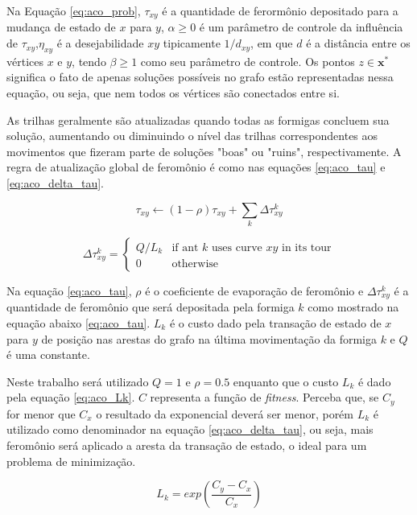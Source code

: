 Na Equação \ref{eq:aco_prob}, $\tau _{xy}$ é a quantidade de ferormônio depositado para a mudança de estado de $x$ para $y$, $\alpha \geq 0$  é um parâmetro de controle da influência de $\tau _{xy}$,$\eta _{xy}$ é a desejabilidade $xy$ tipicamente $1/d_{{xy}}$, em que $d$ é a distância entre os vértices $\textit{x}$ e $\textit{y}$, tendo $\beta  \geq 1$ como seu parâmetro de controle. Os pontos $z\in \mathbf{x^*}$ significa o fato de apenas soluções possíveis no grafo estão representadas nessa equação, ou seja, que nem todos os vértices são conectados entre si.

As trilhas geralmente são atualizadas quando todas as formigas concluem sua solução, aumentando ou diminuindo o nível das trilhas correspondentes aos movimentos que fizeram parte de soluções "boas" ou "ruins", respectivamente. A regra de atualização global de feromônio é como nas equações \ref{eq:aco_tau} e \ref{eq:aco_delta_tau}.

\begin{equation}
\label{eq:aco_tau}
    \tau_{xy} \leftarrow
    (1-\rho)\tau_{xy} + \sum_{k}\Delta \tau^{k}_{xy}
\end{equation}

\begin{equation}
\label{eq:aco_delta_tau}
    \Delta{\tau^{k}_{xy}} =
    \begin{cases}
    Q/L_k & \mbox{if ant }k\mbox{ uses curve }xy\mbox{ in its tour} \\
    0 & \mbox{otherwise}
    \end{cases}
\end{equation}

Na equação \ref{eq:aco_tau}, $\rho$ é o coeficiente de evaporação de feromônio e $\Delta \tau _{xy}^{k}$ é a quantidade de feromônio que será depositada pela formiga $k$ como mostrado na equação abaixo \ref{eq:aco_tau}. $L_{k}$ é o custo dado pela transação de estado de $x$ para $y$ de posição nas arestas do grafo na última movimentação da formiga $k$ e $Q$ é uma constante. 

Neste trabalho será utilizado $Q = 1$  e $\rho = 0.5$ enquanto que o custo $L_{k}$ é dado pela equação \ref{eq:aco_Lk}. $C$ representa a função de \textit{fitness}. Perceba que, se $C_y$ for menor que $C_x$ o resultado da exponencial deverá ser menor, porém $L_{k}$ é utilizado como denominador na equação \ref{eq:aco_delta_tau}, ou seja, mais feromônio será aplicado a aresta da transação de estado, o ideal para um problema de minimização.

\begin{equation}
\label{eq:aco_Lk}
    L_{k} =
    exp(\frac{C_y - C_x}{C_x})
\end{equation}

